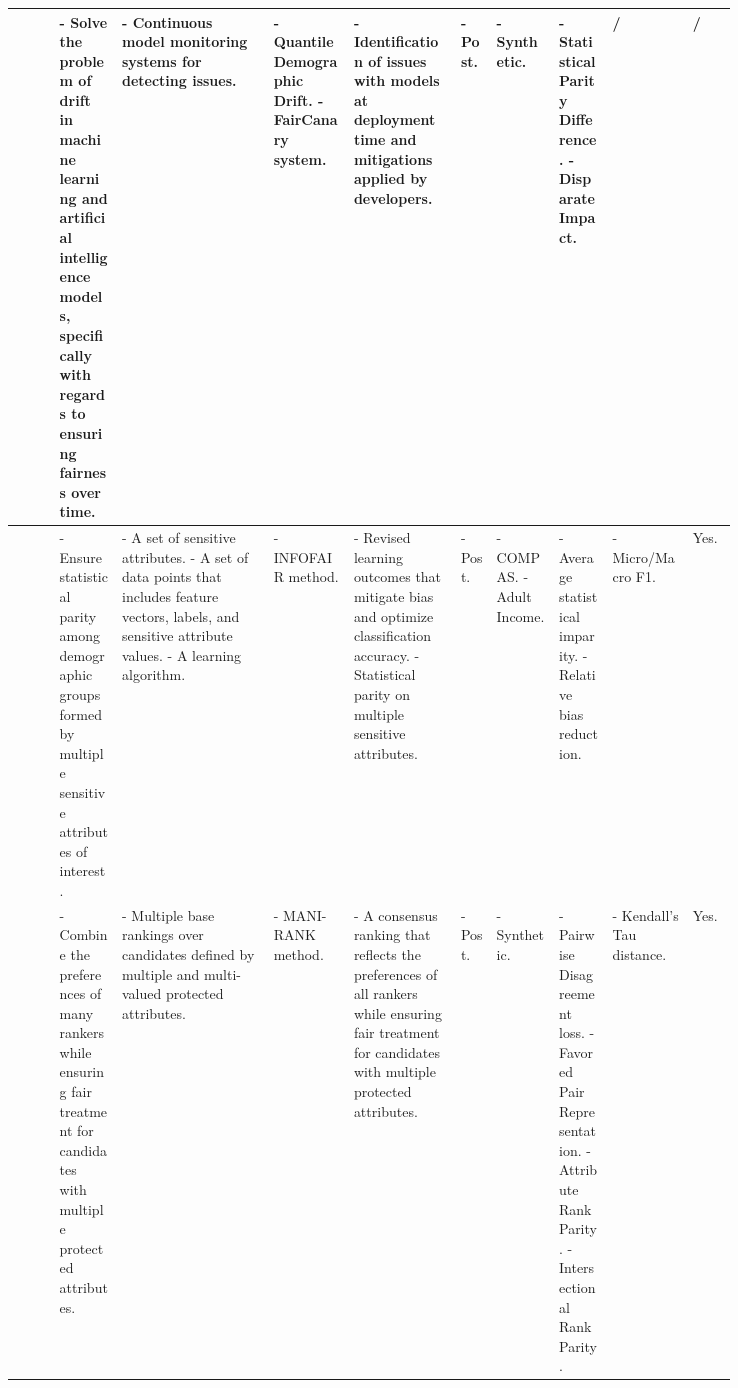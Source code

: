 \begin{landscape}
\begin{longtable}{|p{0.05\linewidth}|p{0.077\linewidth}|p{0.171\linewidth}|p{0.092\linewidth}|p{0.121\linewidth}|p{0.042\linewidth}|p{0.077\linewidth}|p{0.06\linewidth}|p{0.094\linewidth}|p{0.052\linewidth}|}
\cite{ghosh2022faircanary} %
& - Solve the problem of drift in machine learning and artificial intelligence models, specifically with regards to ensuring fairness over time. 
& - Continuous model monitoring systems for detecting issues.
& - Quantile Demographic Drift.\newline
- FairCanary system. 
& - Identification of issues with models at deployment time and mitigations applied by developers. 
& - Post. 
& - Synthetic.  
& - Statistical Parity Difference.\newline
- Disparate Impact. 
& / 
& / \\ \hline


\cite{kang2022infofair} %
& - Ensure statistical parity among demographic groups formed by multiple sensitive attributes of interest. 
& - A set of sensitive attributes.\newline
- A set of data points that includes feature vectors, labels, and sensitive attribute values.\newline
- A learning algorithm. 
& - INFOFAIR method. 
& - Revised learning outcomes that mitigate bias and optimize classification accuracy.\newline
- Statistical parity on multiple sensitive attributes. 
& - Post. 
& - COMPAS.\newline
- Adult Income.  
& - Average statistical imparity.\newline
- Relative bias reduction. 
& - Micro/Macro F1. 
& Yes. \\ \hline

\cite{cachel2022mani} %
& - Combine the preferences of many rankers while ensuring fair treatment for candidates with multiple protected attributes. 
& - Multiple base rankings over candidates defined by multiple and multi-valued protected attributes.
& - MANI-RANK method. 
& - A consensus ranking that reflects the preferences of all rankers while ensuring fair treatment for candidates with multiple protected attributes. 
& - Post. 
& - Synthetic. 
& - Pairwise Disagreement loss.\newline
- Favored Pair Representation.\newline
- Attribute Rank Parity.\newline
- Intersectional Rank Parity. 
& - Kendall's Tau distance.
& Yes. \\ \hline


\end{longtable}
\end{landscape}
